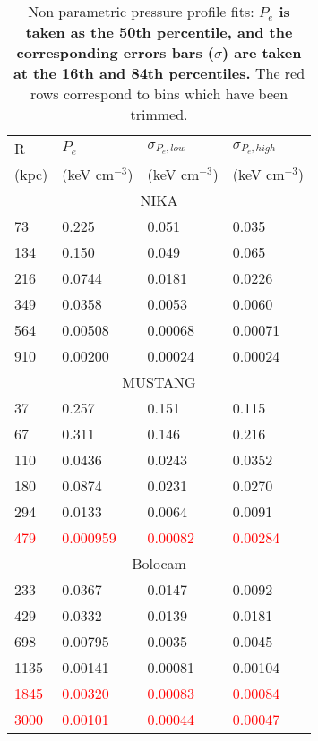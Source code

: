 \begin{table}  %
  \caption{\footnotesize{Non parametric pressure profile fits: \textbf{$P_e$ is taken as the 50th
      percentile, and the corresponding errors bars ($\sigma$) are taken at the 16th and 84th percentiles.}
      The red rows correspond to bins which have been trimmed.}}
  \begin{center}
    \begin{tabular}{|l|lll|}
      \hline
      R     & $P_e$          & $\sigma_{P_e,low}$ & $\sigma_{P_e,high}$ \\
      (kpc) & (keV cm$^{-3}$) & (keV cm$^{-3}$)   & (keV cm$^{-3}$)   \\
      \hline
      \multicolumn{4}{|c|}{NIKA} \\
      \hline
      73    & 0.225   & 0.051   & 0.035   \\
      134   & 0.150   & 0.049   & 0.065   \\
      216   & 0.0744  & 0.0181  & 0.0226  \\
      349   & 0.0358  & 0.0053  & 0.0060  \\
      564   & 0.00508 & 0.00068 & 0.00071 \\
      910   & 0.00200 & 0.00024 & 0.00024 \\
      \hline
      \multicolumn{4}{|c|}{MUSTANG} \\
      \hline
      37   & 0.257    & 0.151   & 0.115   \\
      67   & 0.311    & 0.146   & 0.216   \\
      110  & 0.0436   & 0.0243  & 0.0352  \\
      180  & 0.0874   & 0.0231  & 0.0270  \\
      294  & 0.0133   & 0.0064  & 0.0091  \\
      \textcolor{red}{479}  & \textcolor{red}{0.000959} &
      \textcolor{red}{0.00082} & \textcolor{red}{0.00284} \\
      \hline
      \multicolumn{4}{|c|}{Bolocam} \\
      \hline
      233  & 0.0367   & 0.0147   & 0.0092  \\
      429  & 0.0332   & 0.0139   & 0.0181  \\
      698  & 0.00795  & 0.0035   & 0.0045  \\
      1135 & 0.00141  & 0.00081  & 0.00104 \\
      \textcolor{red}{1845} & \textcolor{red}{0.00320}  &
      \textcolor{red}{0.00083}  & \textcolor{red}{0.00084} \\
      \textcolor{red}{3000} & \textcolor{red}{0.00101}  &
      \textcolor{red}{0.00044}  & \textcolor{red}{0.00047} \\
      \hline
    \end{tabular}
  \end{center}
  \label{tbl:nppp_res}
\end{table}

